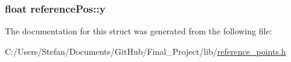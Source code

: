 \hypertarget{structreference_pos_ae4599fc96bf90c0748eaea09f64bc304}{
\subsubsection[{y}]{\setlength{\rightskip}{0pt plus 5cm}float reference\+Pos\+::y}}\label{structreference_pos_ae4599fc96bf90c0748eaea09f64bc304}


The documentation for this struct was generated from the following file\+:\begin{DoxyCompactItemize}
\item 
C\+:/\+Users/\+Stefan/\+Documents/\+Git\+Hub/\+Final\+\_\+\+Project/lib/\hyperlink{reference__points_8h}{reference\+\_\+points.\+h}\end{DoxyCompactItemize}
